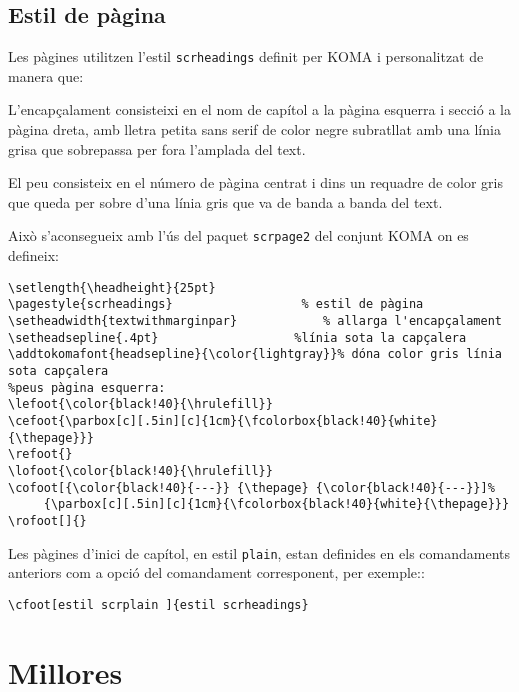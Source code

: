 \documentclass[a4paper,%
                             twoside,%
                             BCOR1.0cm,%
                             DIV11,%
                             parskip=full,%
                             11pt]{scrbook}
\begin{document}
\section{Estil de pàgina} \label{sec:estilspag}
Les pàgines utilitzen l'estil \verb+scrheadings+ definit per KOMA i personalitzat de manera que:
\begin{objectius}%
\item  L'encapçalament consisteixi en el nom de capítol a la pàgina esquerra i secció a la pàgina dreta, amb lletra petita sans serif de color negre subratllat amb una línia grisa que sobrepassa per fora l'amplada del text.
\item  El peu consisteix en el número de pàgina centrat i dins un requadre de color gris que queda per sobre d'una línia gris que va de banda a banda del text.
\end{objectius}
Això s'aconsegueix amb l'ús del paquet \verb+scrpage2+ del conjunt KOMA on es defineix:
\begin{tiny}
\begin{verbatim}
\setlength{\headheight}{25pt}	      		   
\pagestyle{scrheadings}			         % estil de pàgina
\setheadwidth{textwithmarginpar}	    	% allarga l'encapçalament
\setheadsepline{.4pt}					%línia sota la capçalera
\addtokomafont{headsepline}{\color{lightgray}}% dóna color gris línia sota capçalera
%peus pàgina esquerra:
\lefoot{\color{black!40}{\hrulefill}}
\cefoot{\parbox[c][.5in][c]{1cm}{\fcolorbox{black!40}{white}{\thepage}}}
\refoot{}
\lofoot{\color{black!40}{\hrulefill}}
\cofoot[{\color{black!40}{---}} {\thepage} {\color{black!40}{---}}]%
     {\parbox[c][.5in][c]{1cm}{\fcolorbox{black!40}{white}{\thepage}}}
\rofoot[]{}
\end{verbatim}
\end{tiny}
Les pàgines d'inici de capítol, en estil \verb+plain+, estan definides en els comandaments anteriors com a opció del comandament corresponent, per exemple::

\begin{scriptsize}\verb+\cfoot[estil scrplain ]{estil scrheadings}+\end{scriptsize}


\chapter{Millores}\label{cap:millores}
\end{document}
